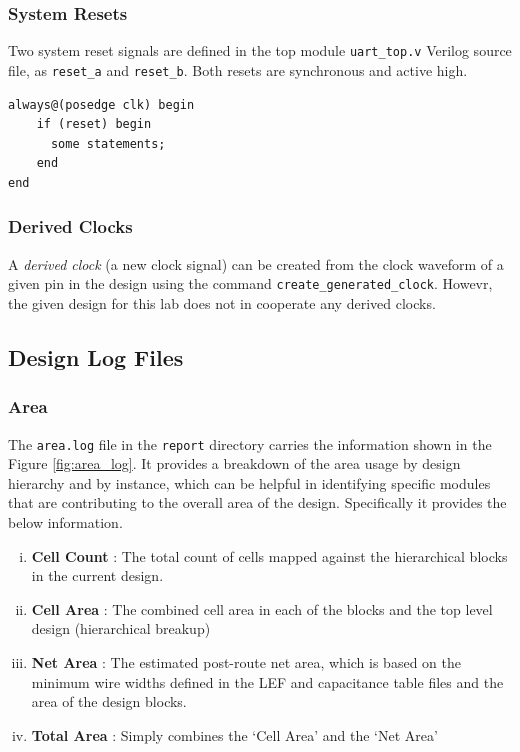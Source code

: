 \documentclass[a4paper,11pt]{article}%
\begin{document}
\subsubsection{System Resets}
Two system reset signals are defined in the top module {\tt uart\_top.v} Verilog source file, as {\tt reset\_a}  and {\tt reset\_b}. Both resets are synchronous and active high.

\begin{Verbatim}[frame=single]
always@(posedge clk) begin	
    if (reset) begin
      some statements;	   
    end
end
\end{Verbatim}

\subsubsection{Derived Clocks}

A \textit{derived clock} (a new clock signal) can be created from the clock waveform of a given pin in the design using the command {\tt create\_generated\_clock}\cite{genus_command_ref_2019}. Howevr, the given design for this lab does not in cooperate any derived clocks.

\subsection{Design Log Files}

\subsubsection{Area}

The {\tt area.log} file in the {\tt report} directory carries the information shown in the Figure \ref{fig:area_log}. It provides a breakdown of the area usage by design hierarchy and by instance, which can be helpful in identifying specific modules that are contributing to the overall area of the design. Specifically it provides the below information\cite{genus_command_ref_2019}.

\begin{enumerate}[i.]
	\item \textbf{{Cell Count}} : The total count of cells mapped against the hierarchical blocks in the current design.
	
	\item \textbf{{Cell Area}} : The combined cell area in each of the blocks and the top level design (hierarchical breakup)
	
	\item \textbf{{Net Area}} : The estimated post-route net area, which is based on the minimum wire widths defined in the LEF and capacitance table files and the area of the design blocks.
	
	\item \textbf{{Total Area}} : Simply combines the `Cell Area' and the `Net Area'
\end{enumerate}
\end{document}
